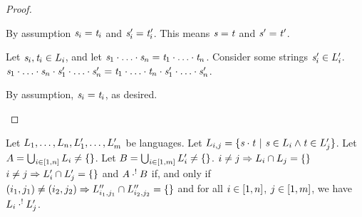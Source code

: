 \documentclass[numbers,10pt,preprint\ifanon ,nocopyrightspace\fi]{sigplanconf}
\begin{document}
\begin{proof}
\begin{case}[$\Leftarrow$]
    By assumption $\mathit{s}_i=\mathit{t}_i$ and $\mathit{s}_i'=\mathit{t}_i'$.
    This means $\mathit{s}=\mathit{t}$ and $\mathit{s}'=\mathit{t}'$.

    Let $\mathit{s}_i,\mathit{t}_i\in L_i$, and let
    $\mathit{s}_1\cdot\ldots\cdot\mathit{s}_n =
    \mathit{t}_1\cdot\ldots\cdot\mathit{t}_n$.
    Consider some strings $\mathit{s}_i'\in L_i'$.
    $\mathit{s}_1\cdot\ldots\cdot\mathit{s}_n\cdot
    \mathit{s}_1'\cdot\ldots\cdot\mathit{s}_n' =
    \mathit{t}_1\cdot\ldots\cdot\mathit{t}_n\cdot
    \mathit{s}_1'\cdot\ldots\cdot\mathit{s}_n'$.
    
    By assumption, $\mathit{s}_i=\mathit{t}_i$, as desired.
  \end{case}
\end{proof}

\begin{lemma}
  \label{lem:unambig-concat-union-equiv}
  Let $L_1,\ldots,L_n,L_1',\ldots,L_m'$ be
  languages.
  Let $L_{i,j} =
  \{\mathit{s} \cdot \mathit{t} ~|~ \mathit{s}\in L_i \wedge
    \mathit{t}\in L_j'\}$.
  Let $A = \bigcup_{i\in[1,n]}L_i \neq \{\}$.
  Let $B = \bigcup_{i\in[1,m]}L_i' \neq \{\}$.
  $i \neq j \Rightarrow L_i \cap L_j = \{\}$
  $i \neq j \Rightarrow L_i' \cap L_j' = \{\}$
  and
  $A \cdot^! B$
  if, and only if
  $(i_1,j_1) \neq (i_2,j_2) \Rightarrow L_{i_1,j_1}'' \cap
  L_{i_2,j_2}'' = \{\}$ and for all $i\in[1,n]$,
  $j\in[1,m]$, we have
  $L_i \cdot^! L_j'$.
\end{lemma}
\end{document}
